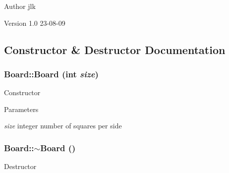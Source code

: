 \begin{DoxyAuthor}{Author}
jlk 
\end{DoxyAuthor}
\begin{DoxyVersion}{Version}
1.0 23-\/08-\/09 
\end{DoxyVersion}


\subsection{Constructor \& Destructor Documentation}
\hypertarget{class_board_a23ec051234acfe51d94664f9ad52a469}{
\subsubsection[{Board}]{\setlength{\rightskip}{0pt plus 5cm}Board::Board (int {\em size})}}
\label{class_board_a23ec051234acfe51d94664f9ad52a469}
Constructor 
\begin{DoxyParams}{Parameters}
\item[{\em size}]integer number of squares per side \end{DoxyParams}
\hypertarget{class_board_af73f45730119a1fd8f6670f53f959e68}{
\subsubsection[{$\sim$Board}]{\setlength{\rightskip}{0pt plus 5cm}Board::$\sim$Board ()}}
\label{class_board_af73f45730119a1fd8f6670f53f959e68}
Destructor 


